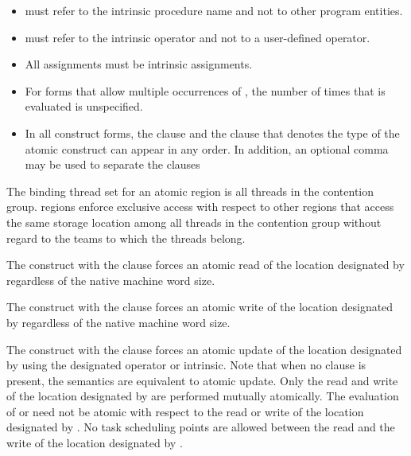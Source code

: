 \begin{itemize}
\item {} must refer to the intrinsic procedure name and not to other 
program entities.

\item {} must refer to the intrinsic operator and not to a user-defined operator.

\item All assignments must be intrinsic assignments.

\item For forms that allow multiple occurrences of , the number of times that  is 
evaluated is unspecified.
\fortranspecificend

\item In all  construct forms, the  clause and the clause that denotes the 
type of the atomic construct can appear in any order. In addition, an optional comma 
may be used to separate the clauses
\end{itemize}

\binding
The binding thread set for an atomic region is all threads in the contention group. 
 regions enforce exclusive access with respect to other  regions that 
access the same storage location  among all threads in the contention group without 
regard to the teams to which the threads belong. 

\descr
The  construct with the  clause forces an atomic read of the location 
designated by  regardless of the native machine word size.

The  construct with the  clause forces an atomic write of the location 
designated by  regardless of the native machine word size.

The  construct with the  clause forces an atomic update of the location 
designated by  using the designated operator or intrinsic. Note that when no clause is 
present, the semantics are equivalent to atomic update. Only the read and write of the 
location designated by  are performed mutually atomically. The evaluation of  or 
 need not be atomic with respect to the read or write of the location designated 
by . No task scheduling points are allowed between the read and the write of the 
location designated by .

